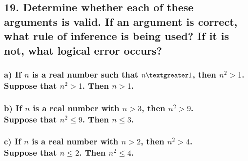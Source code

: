 \documentclass[11pt, oneside]{article} %
\numberwithin{equation}{section} %
\numberwithin{figure}{section} %
\numberwithin{table}{section} %
\begin{document}

\subsection{19. Determine whether each of these arguments is valid. If an argument is correct, what rule of inference is being used? If it is not, what logical error occurs?}
\subsubsection{a) If $n$ is a real number such that $n \textgreater 1$, then $n^2 > 1$.\\
Suppose that $n^2 > 1$. Then $n > 1$.}
\subsubsection{b) If $n$ is a real number with $n>3$, then $n^2 > 9$.\\
Suppose that $n^2 \leq 9$. Then $n \leq 3$.}
\subsubsection{c) If $n$ is a real number with $n>2$, then $n^2 > 4$. \\
Suppose that $n \leq 2$. Then $n^2 \leq 4$.}

\end{document}
